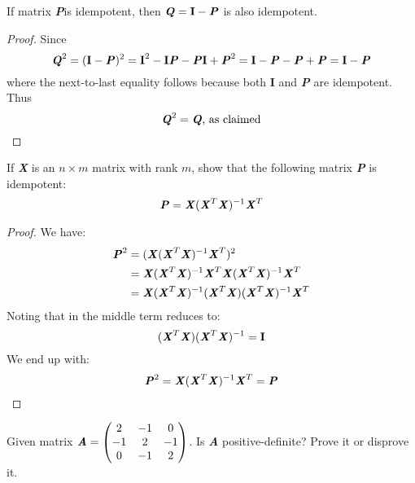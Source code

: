 \documentclass[12pt]{article}
\newcommand{\blditA}{\textbf{\textit{A}}}
\newcommand{\blditP}{\textbf{\textit{P}}}
\newcommand{\blditQ}{\textbf{\textit{Q}}}
\newcommand{\bldI}{\textbf{I}}
\newcommand{\blditX}{\textbf{\textit{X}}}
\newenvironment{question}[2][Question]{\begin{trivlist}
\item[\hskip \labelsep {\bfseries #1}\hskip \labelsep {\bfseries #2.}]}{\end{trivlist}}
\begin{document}
\bigskip
\bigskip

\begin{question}{1. 3. a} 
If matrix \blditP is idempotent, then $\blditQ = \bldI - \blditP$ is also idempotent.
\end{question}

\begin{proof}
Since
\begin{equation*}
\blditQ^2 = (\bldI - \blditP)^2 = \bldI^2 - \bldI \blditP - \blditP \bldI + \blditP^2 = \bldI - \blditP - \blditP + \blditP = \bldI - \blditP 
\end{equation*}
where the next-to-last equality follows because both \bldI $ $ and \blditP $ $ are idempotent. Thus
\begin{equation*}
\blditQ^2 = \blditQ \text{, as claimed}
\end{equation*}
\end{proof}



\bigskip
\begin{question}{1. 3. b} 
If \blditX $ $ is an $n \times m$ matrix with rank $m$, show that the following matrix \blditP $ $ is idempotent:
\begin{equation*}
\blditP = \blditX (\blditX^T \blditX)^{-1}\blditX^T
\end{equation*}

\end{question}

\begin{proof}
We have:
\begin{align*}
\blditP^2 &= (\blditX (\blditX^T \blditX)^{-1}\blditX^T)^2 \\
 & = \blditX (\blditX^T \blditX)^{-1}\blditX^T \blditX (\blditX^T \blditX)^{-1}\blditX^T \\
 & = \blditX (\blditX^T \blditX)^{-1}(\blditX^T \blditX) (\blditX^T \blditX)^{-1}\blditX^T 
\end{align*}
Noting that in the middle term reduces to:
\begin{equation*}
(\blditX^T \blditX) (\blditX^T \blditX)^{-1} = \bldI
\end{equation*}
We end up with:
\begin{equation*}
\blditP^2 = \blditX (\blditX^T \blditX)^{-1}\blditX^T = \blditP
\end{equation*}
\end{proof}

\bigskip
\bigskip
\begin{question}{1. 4} 
Given matrix $\blditA =  \begin{pmatrix}
  2 & -1 & 0\\
  -1 & 2 & -1\\
  0 & -1 & 2
\end{pmatrix} $. Is \blditA $ $ positive-definite? Prove it or disprove it.
\end{question}
\end{document}
